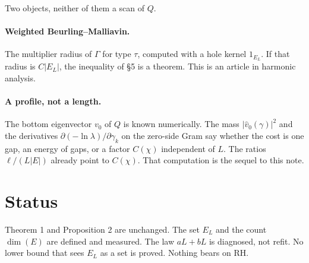 \documentclass[11pt]{article}
\theoremstyle{remark}\newtheorem*{remark}{Remark}
\begin{document}
Two objects, neither of them a scan of \(Q\).

\paragraph{Weighted Beurling--Malliavin.}
The multiplier radius of \(\Gamma\) for type \(\tau\), computed with
a hole kernel \(1_{E_L}\). If that radius is \(C|E_L|\), the
inequality of §5 is a theorem. This is an article in harmonic
analysis.

\paragraph{A profile, not a length.}
The bottom eigenvector \(v_0\) of \(Q\) is known numerically. The
mass \(|\hat v_0(\gamma)|^2\) and the derivatives
\(\partial(-\ln\lambda)/\partial\gamma_k\) on the zero-side Gram say
whether the cost is one gap, an energy of gaps, or a factor
\(C(\chi)\) independent of \(L\). The ratios \(\ell/(L|E|)\) already
point to \(C(\chi)\). That computation is the sequel to this note.

\section*{Status}
Theorem 1 and Proposition 2 are unchanged. The set \(E_L\) and the
count \(\dim(E)\) are defined and measured. The law \(aL+bL\) is
diagnosed, not refit. No lower bound that sees \(E_L\) as a set is
proved. Nothing bears on RH.
\end{document}
